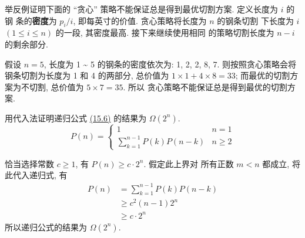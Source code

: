 \documentclass[boxes]{homework}
\begin{document}
\begin{problem}
举反例证明下面的 ``贪心'' 策略不能保证总是得到最优切割方案. 定义长度为 $i$ 的钢
条的\textbf{密度}为 $p_{i} / i$, 即每英寸的价值. 贪心策略将长度为 $n$ 的钢条切割
下长度为 $i$ $(1\leqslant i\leqslant n)$ 的一段, 其密度最高. 接下来继续使用相同
的策略切割长度为 $n - i$ 的剩余部分.
\end{problem}
\begin{solution}
    假设 $n = 5$, 长度为 1 \textasciitilde{} 5 的钢条的密度依次为: 1, 2, 2, 8,
    7. 则按照贪心策略会将钢条切割为长度为 1 和 4 的两部分, 总价值为 $1\times 1 +
        4 \times 8 = 33$; 而最优的切割方案为不切割, 总价值为 $5 \times 7 = 35$. 所以
    贪心策略不能保证总是得到最优的切割方案.
\end{solution}

\begin{problem}
用代入法证明递归公式 \hyperref[eq:15.2.3.1]{(15.6)} 的结果为 $\Omega(2^{n})$.
\begin{equation}
    \label{eq:15.2.3.1}
    P(n) = \begin{cases}
        1                                               & n = 1         \\
        \displaystyle \sum_{k = 1}^{n - 1} P(k)P(n - k) & n \geqslant 2
    \end{cases}
    \tag{15.6}
\end{equation}
\end{problem}
\begin{solution}
    恰当选择常数 $c \geqslant 1$, 有 $P(n)\geqslant c \cdot 2^{n}$. 假定此上界对
    所有正数 $m < n$ 都成立, 将此代入递归式, 有
    \begin{equation}
        \begin{aligned}
            P(n)
             & = \sum_{k = 1}^{n - 1} P(k)P(n - k) \\
             & \geqslant c^{2} (n - 1) 2^{n}       \\
             & \geqslant c \cdot 2^{n}
        \end{aligned}
    \end{equation}
    所以递归公式的结果为 $\Omega(2^{n})$.
\end{solution}
\end{document}
